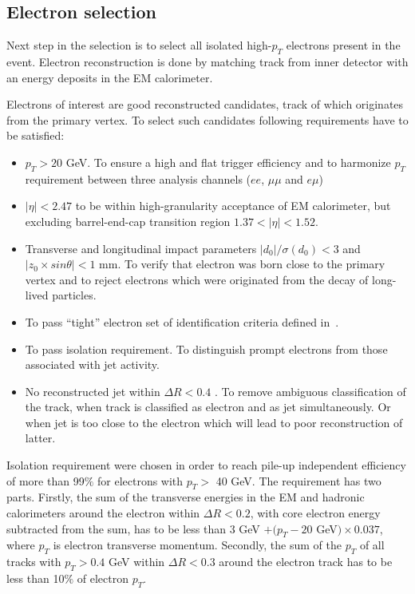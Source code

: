 \subsection{Electron selection}
\label{subsec:electron_selection}
Next step in the selection is to select all isolated high-$p_T$ electrons present in the event.
Electron reconstruction is done by matching track from inner detector with an energy deposits in the EM calorimeter.




Electrons of interest are good reconstructed candidates, track of which originates from the primary vertex. To select such candidates following requirements have to be satisfied:
\begin{itemize}
 \item $p_T > 20$ GeV. To ensure a high and flat trigger efficiency and to harmonize $p_T$ requirement between three analysis channels ($ee$, $\mu\mu$ and $e\mu$) 
 \item $|\eta|<2.47$ to be within high-granularity acceptance of EM calorimeter, but excluding barrel-end-cap transition region $1.37<|\eta|<1.52$.
 \item Transverse and longitudinal impact parameters $|d_0|/\sigma(d_0) < 3$ and $|z_0 \times sin \theta| < 1$ mm. 
 To verify that electron was born close to the primary vertex and to reject electrons which were originated from the decay of long-lived particles.
 \item To pass ``tight'' electron set of identification criteria defined in~\cite{electron_tight}. \\ 
 \item To pass isolation requirement. To distinguish prompt electrons from those associated with jet activity.
 \item No reconstructed jet within $\Delta R < 0.4$ \toFix[define R]. To remove ambiguous classification of the track, when track is classified as electron and as jet simultaneously. 
 Or when jet is too close to the electron which will lead to poor reconstruction of latter. 
\end{itemize}

Isolation requirement were chosen in order to reach pile-up independent efficiency of more than 99$\%$ for electrons 
with $p_T >$ 40 GeV. The requirement has two parts.
Firstly, the sum of the transverse energies in the EM and hadronic calorimeters around the electron within 
$\Delta R < 0.2$, with core electron energy subtracted from the sum, has to be less than 
3 GeV $+ (p_T - 20$ GeV$) \times 0.037$, where $p_T$ is electron transverse momentum.
Secondly, the sum of the $p_T$ of all tracks with $p_T > 0.4$ GeV within $\Delta R < 0.3$ around the electron track has
to be less than 10$\%$ of electron $p_T$.


